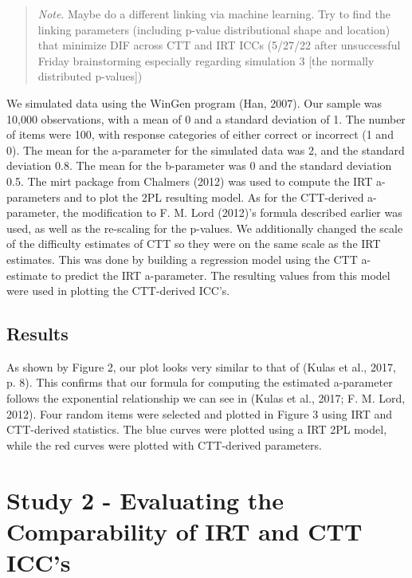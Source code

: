 \documentclass[
  man]{apa6}
\begin{document}
\begin{quote}
\emph{Note}. Maybe do a different linking via machine learning. Try to find the linking parameters (including p-value distributional shape and location) that minimize DIF across CTT and IRT ICCs (5/27/22 after unsuccessful Friday brainstorming especially regarding simulation 3 {[}the normally distributed p-values{]})
\end{quote}

We simulated data using the WinGen program (Han, 2007). Our sample was 10,000 observations, with a mean of 0 and a standard deviation of 1. The number of items were 100, with response categories of either correct or incorrect (1 and 0). The mean for the a-parameter for the simulated data was 2, and the standard deviation 0.8. The mean for the b-parameter was 0 and the standard deviation 0.5. The mirt package from Chalmers (2012) was used to compute the IRT a-parameters and to plot the 2PL resulting model. As for the CTT-derived a-parameter, the modification to F. M. Lord (2012)'s formula described earlier was used, as well as the re-scaling for the p-values. We additionally changed the scale of the difficulty estimates of CTT so they were on the same scale as the IRT estimates. This was done by building a regression model using the CTT a-estimate to predict the IRT a-parameter. The resulting values from this model were used in plotting the CTT-derived ICC's.

\hypertarget{results}{%
\subsection{Results}\label{results}}

As shown by Figure 2, our plot looks very similar to that of (Kulas et al., 2017, p. 8). This confirms that our formula for computing the estimated a-parameter follows the exponential relationship we can see in (Kulas et al., 2017; F. M. Lord, 2012). Four random items were selected and plotted in Figure 3 using IRT and CTT-derived statistics. The blue curves were plotted using a IRT 2PL model, while the red curves were plotted with CTT-derived parameters.

\hypertarget{study-2---evaluating-the-comparability-of-irt-and-ctt-iccs}{%
\section{Study 2 - Evaluating the Comparability of IRT and CTT ICC's}\label{study-2---evaluating-the-comparability-of-irt-and-ctt-iccs}}
\end{document}
